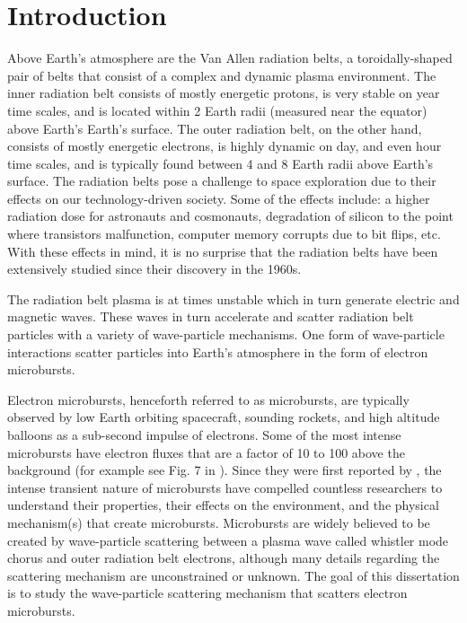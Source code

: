 \chapter{Introduction}\label{CH:introduction}
Above Earth's atmosphere are the Van Allen radiation belts, a toroidally-shaped pair of belts that consist of a complex and dynamic plasma environment. The inner radiation belt consists of mostly energetic protons, is very stable on year time scales, and is located within 2 Earth radii (measured near the equator) above Earth's Earth's surface. The outer radiation belt, on the other hand, consists of mostly energetic electrons, is highly dynamic on day, and even hour time scales, and is typically found between 4 and 8 Earth radii above Earth's surface. The radiation belts pose a challenge to space exploration due to their effects on our technology-driven society. Some of the effects include: a higher radiation dose for astronauts and cosmonauts, degradation of silicon to the point where transistors malfunction, computer memory corrupts due to bit flips, etc. With these effects in mind, it is no surprise that the radiation belts have been extensively studied since their discovery in the 1960s.

The radiation belt plasma is at times unstable which in turn generate electric and magnetic waves. These waves in turn accelerate and scatter radiation belt particles with a variety of wave-particle mechanisms. One form of wave-particle interactions scatter particles into Earth's atmosphere in the form of electron microbursts.

Electron microbursts, henceforth referred to as microbursts, are typically observed by low Earth orbiting spacecraft, sounding rockets, and high altitude balloons as a sub-second impulse of electrons. Some of the most intense microbursts have electron fluxes that are a factor of 10 to 100 above the background (for example see Fig. 7 in \citet{Blake1996}). Since they were first reported by \citet{Anderson1964}, the intense transient nature of microbursts have compelled countless researchers to understand their properties, their effects on the environment, and the physical mechanism(s) that create microbursts. Microbursts are widely believed to be created by wave-particle scattering between a plasma wave called whistler mode chorus and outer radiation belt electrons, although many details regarding the scattering mechanism are unconstrained or unknown. The goal of this dissertation is to study the wave-particle scattering mechanism that scatters electron microbursts. 

